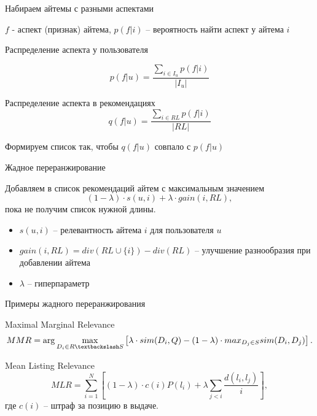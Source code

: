 \documentclass[11pt,aspectratio=169,handout]{beamer}
\begin{document}
\begin{frame}{Набираем айтемы с разными аспектами}

$f$ - аспект (признак) айтема, $p(f | i)$ -- вероятность найти аспект у айтема $i$

\vfill

Распределение аспекта у пользователя

\[
p(f | u) = \frac{\sum_{i \in I_u} p(f | i)}{|I_u|}  
\]

Распределение аспекта в рекомендациях
\[
q(f | u) = \frac{\sum_{i \in RL} p(f | i)}{|RL|}
\]

\begin{tcolorbox}[colback=info!5,colframe=info!80,title=]
Формируем список так, чтобы $q(f | u)$ совпало с $p(f | u)$
\end{tcolorbox}

\end{frame}

\begin{frame}{Жадное переранжирование}

\begin{tcolorbox}[colback=info!5,colframe=info!80,title=]
Добавляем в список рекомендаций айтем с максимальным значением
\[
(1 - \lambda) \cdot s(u, i) + \lambda \cdot gain(i, RL),
\]
пока не получим список нужной длины.
\end{tcolorbox}

\vfill

\begin{itemize}
\item $s(u, i)$ -- релевантность айтема $i$ для пользователя $u$ 
\item $gain(i, RL) = div(RL \cup \{i\}) - div(RL)$ -- улучшение разнообразия при добавлении айтема
\item $\lambda$ -- гиперпараметр
\end{itemize}

\end{frame}

\begin{frame}{Примеры жадного переранжирования}

Maximal Marginal Relevance \cite{MMR}
\[
MMR = \arg \max_{D_i \in R \textbackslash S} \left[\lambda \cdot sim(D_i, Q) - (1 - \lambda) \cdot max_{D_j \in S} sim(D_i, D_j) \right].
\]

Mean Listing Relevance \cite{AIRBNB}
\[
MLR = \sum_{i=1}^N \left[ (1 - \lambda) \cdot c(i) P(l_i) + \lambda \sum_{j < i} \frac{d(l_i, l_j)}{i} \right],
\]
где $c(i)$ -- штраф за позицию в выдаче.

\end{frame}
\end{document}
